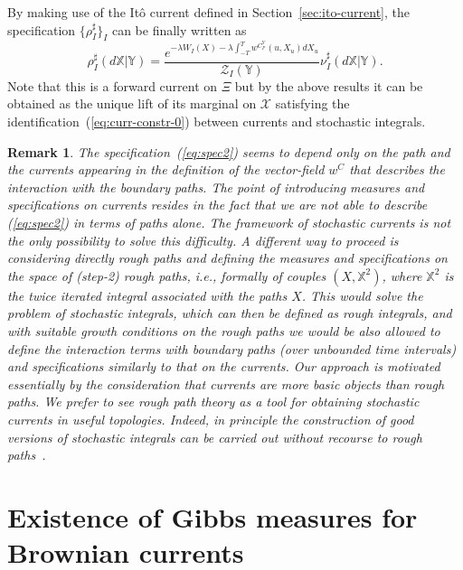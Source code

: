 \documentclass[a4paper,11pt]{article}
\newtheorem{remark}[theorem]{Remark}
\newcommand{\X}{\mathcal{X}}
\begin{document}
\medskip
By making use of the It\^o current defined in
Section~\ref{sec:ito-current}, the specification $\{\rho^\sharp_I\}_I$ 
can be finally written as
\begin{equation}
\label{eq:specc2}
\rho^\sharp_I(d\mathbb{X}|\mathbb{Y}) =
\frac{e^{-\lambda W_I(X)-
\lambda \int_{-T}^T w^{C_{I^c}^Y}(u,X_u)dX_u}}{\mathcal Z_I(\mathbb{Y})} 
\nu^\sharp_I(d\mathbb{X} | \mathbb{Y}) . 
\end{equation}
Note that this is a forward current on $\Xi$ but by the above results it 
can be obtained as the unique lift of its marginal on $\X$ satisfying the
identification~(\ref{eq:curr-constr-0}) between currents and stochastic
integrals. 

\begin{remark}
\rm{
The specification~(\ref{eq:spec2}) seems to depend only on the path
and the currents appearing in the definition of the vector-field 
$w^C$ that describes the interaction with the boundary paths. The point 
of introducing measures and specifications on currents resides in the 
fact that we are not able to describe (\ref{eq:spec2}) in terms of 
paths alone. The framework of stochastic currents is not the only
possibility to solve this difficulty. A different way to proceed is 
considering directly rough paths and defining the measures and 
specifications on the space of (step-2) rough paths, i.e., formally of
couples $(X,\mathbb{X}^2)$, where $\mathbb{X}^2$ is the twice iterated
integral associated with the paths $X$. This would solve the problem
of stochastic integrals, which can then be defined as rough integrals, 
and with suitable growth conditions on the rough paths we would be 
also allowed to define the interaction terms with boundary paths (over
unbounded time intervals) and specifications similarly to that on the 
currents. Our approach is motivated essentially by the consideration 
that currents are more basic objects than rough paths. We prefer to
see rough path theory as a tool for obtaining stochastic currents in
useful topologies. Indeed, in principle the construction of good 
versions of stochastic integrals can be carried out without recourse 
to rough paths~\cite{FGGT,FGR}. 
}
\end{remark}



\section{Existence of Gibbs measures for Brownian currents}
\label{sect:cluster}
\end{document}
